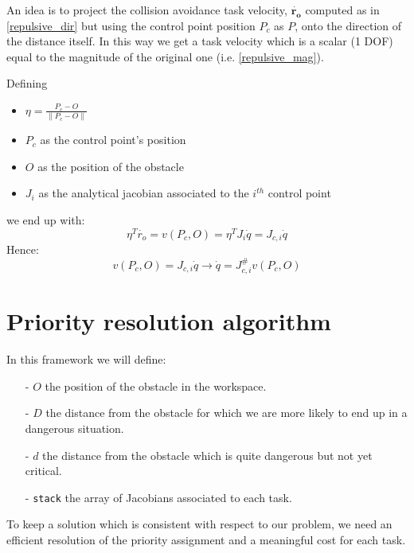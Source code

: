 \documentclass[12pt, a4paper]{article}
\newcommand{\norm}[1]{\parallel{#1}\parallel}
\begin{document}
An idea is to project the collision avoidance task velocity, $\mathbf{\dot{r_{o}}}$ computed as in \eqref{repulsive_dir} but using the control point position $P_c$ as $P$, onto the direction of the distance itself. In this way we get a task velocity which is a scalar (1 DOF) equal to the magnitude of the original one (i.e. \eqref{repulsive_mag}).

Defining 
\begin{itemize}
	\item $\eta = \frac{P_c - O}{\norm{P_c-O}}$
	\item $P_c$ as the control point's position
	\item $O$ as the position of the obstacle
	\item $J_i$ as the analytical jacobian associated to the $i^{th}$ control point
\end{itemize}
we end up with:
\begin{equation*}
\eta^T\dot{r_{o}} = v(P_c,O) =\eta^T J_i\dot{q} = J_{c,i}\dot{q}
\end{equation*}
Hence:
\begin{equation}
v(P_c,O) = J_{c,i}\dot{q} \rightarrow \dot{q} = J_{c,i}^{\#}v(P_c,O)
\end{equation}


\section{Priority resolution algorithm}
In this framework we will define:
\begin{enumerate}
\item[-] $O$ the position of the obstacle in the workspace.
\item[-] $D$ the distance from the obstacle for which we are more likely to end up in a dangerous situation.
\item[-] $d$ the distance from the obstacle which is quite dangerous but not yet critical.
\item[-] \texttt{stack} the array of Jacobians associated to each task.
\end{enumerate}
To keep a solution which is consistent with respect to our problem, we need an efficient resolution of the priority assignment and a meaningful cost for each task.
\end{document}
